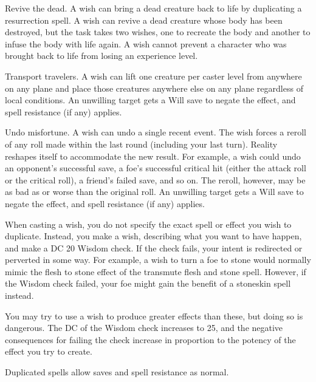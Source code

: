 \begin{spelleffect}
\begin{itemize*}
    \item Revive the dead. A wish can bring a dead creature back to life by duplicating a resurrection spell. A wish can revive a dead creature whose body has been destroyed, but the task takes two wishes, one to recreate the body and another to infuse the body with life again. A wish cannot prevent a character who was brought back to life from losing an experience level.
    \item Transport travelers. A wish can lift one creature per caster level from anywhere on any plane and place those creatures anywhere else on any plane regardless of local conditions. An unwilling target gets a Will save to negate the effect, and spell resistance (if any) applies.
    \item Undo misfortune. A wish can undo a single recent event. The wish forces a reroll of any roll made within the last round (including your last turn). Reality reshapes itself to accommodate the new result. For example, a wish could undo an opponent's successful save, a foe's successful critical hit (either the attack roll or the critical roll), a friend's failed save, and so on. The reroll, however, may be as bad as or worse than the original roll. An unwilling target gets a Will save to negate the effect, and spell resistance (if any) applies.
  \end{itemize*}
  \par When casting a wish, you do not specify the exact spell or effect you wish to duplicate. Instead, you make a wish, describing what you want to have happen, and make a DC 20 Wisdom check. If the check fails, your intent is redirected or perverted in some way. For example, a wish to turn a foe to stone would normally mimic the flesh to stone effect of the transmute flesh and stone spell. However, if the Wisdom check failed, your foe might gain the benefit of a stoneskin spell instead.
  \par You may try to use a wish to produce greater effects than these, but doing so is dangerous. The DC of the Wisdom check increases to 25, and the negative consequences for failing the check increase in proportion to the potency of the effect you try to create.
\end{spelleffect}
\begin{spellnotes}
  Duplicated spells allow saves and spell resistance as normal.
\end{spellnotes}

